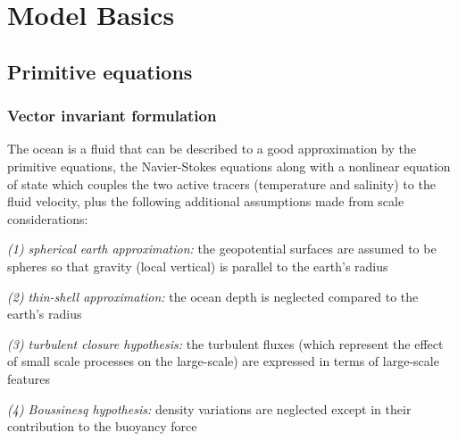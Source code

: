 \documentclass[../main/NEMO_manual]{subfiles}
\begin{document}

\chapter{Model Basics}
\label{chap:PE}

\minitoc

\newpage

\section{Primitive equations}
\label{sec:PE_PE}


\subsection{Vector invariant formulation}
\label{subsec:PE_Vector}


The ocean is a fluid that can be described to a good approximation by the primitive equations,
\ie the Navier-Stokes equations along with a nonlinear equation of state which
couples the two active tracers (temperature and salinity) to the fluid velocity,
plus the following additional assumptions made from scale considerations:

\textit{(1) spherical earth approximation:} the geopotential surfaces are assumed to be spheres so that
gravity (local vertical) is parallel to the earth's radius

\textit{(2) thin-shell approximation:} the ocean depth is neglected compared to the earth's radius

\textit{(3) turbulent closure hypothesis:} the turbulent fluxes
(which represent the effect of small scale processes on the large-scale) are expressed in terms of
large-scale features

\textit{(4) Boussinesq hypothesis:} density variations are neglected except in their contribution to
the buoyancy force
\end{document}
